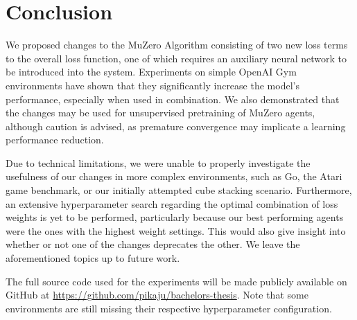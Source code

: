 \section{Conclusion}
We proposed changes to the MuZero Algorithm consisting of two new loss terms to the overall loss function, one of which requires an auxiliary neural network to be introduced into the system. Experiments on simple OpenAI Gym environments have shown that they significantly increase the model's performance, especially when used in combination. We also demonstrated that the changes may be used for unsupervised pretraining of MuZero agents, although caution is advised, as premature convergence may implicate a learning performance reduction.

Due to technical limitations, we were unable to properly investigate the usefulness of our changes in more complex environments, such as Go, the Atari game benchmark, or our initially attempted cube stacking scenario. Furthermore, an extensive hyperparameter search regarding the optimal combination of loss weights is yet to be performed, particularly because our best performing agents were the ones with the highest weight settings. This would also give insight into whether or not one of the changes deprecates the other. We leave the aforementioned topics up to future work.

The full source code used for the experiments will be made publicly available on GitHub at \url{https://github.com/pikaju/bachelors-thesis}. Note that some environments are still missing their respective hyperparameter configuration.
